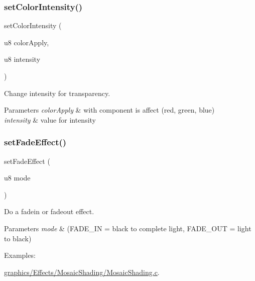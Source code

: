 \subsubsection{\texorpdfstring{set\+Color\+Intensity()}{setColorIntensity()}}
{\footnotesize\ttfamily set\+Color\+Intensity (\begin{DoxyParamCaption}\item[{u8}]{color\+Apply,  }\item[{u8}]{intensity }\end{DoxyParamCaption})}



Change intensity for transparency. 


\begin{DoxyParams}{Parameters}
{\em color\+Apply} & with component is affect (red, green, blue) \\
\hline
{\em intensity} & value for intensity \\
\hline
\end{DoxyParams}
\mbox{\label{a00368_ac34bd13a8556c8ac8e1eeeded15f7632}} 
\subsubsection{\texorpdfstring{set\+Fade\+Effect()}{setFadeEffect()}}
{\footnotesize\ttfamily set\+Fade\+Effect (\begin{DoxyParamCaption}\item[{u8}]{mode }\end{DoxyParamCaption})}



Do a fadein or fadeout effect. 


\begin{DoxyParams}{Parameters}
{\em mode} & (F\+A\+D\+E\+\_\+\+IN = black to complete light, F\+A\+D\+E\+\_\+\+O\+UT = light to black) \\
\hline
\end{DoxyParams}
\begin{Desc}
\item[Examples\+: ]\par
\hyperlink{a00421}{graphics/\+Effects/\+Mosaic\+Shading/\+Mosaic\+Shading.\+c}.\end{Desc}
\mbox{\label{a00368_afd9e46ae627d055dd8c98a4b0ebb73b1}} 
